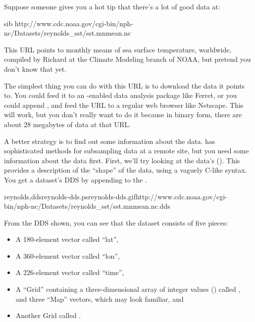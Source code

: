 \documentclass{dods-book}
\begin{document}
Suppose someone gives you a hot tip that there's a lot of good data
at:

\begin{vcode}{sib}
http://www.cdc.noaa.gov/cgi-bin/nph-nc/Datasets/reynolds_sst/sst.mnmean.nc
\end{vcode}

This URL points to monthly means of sea surface temperature,
worldwide, compiled by Richard  at the Climate Modeling branch
of NOAA, but pretend you don't know that yet. 

The simplest thing you can do with this URL is to download the data it
points to.  You could feed it to an \opendap-enabled data analysis package
like Ferret, or you could append , and feed the URL to a
regular web browser like Netscape.  This will work, but you don't
really want to do it because in binary form, there are about 28
megabytes of data at that URL.


A better strategy is to find out some information about the data.
\opendap has sophisticated methods for subsampling data at a remote site,
but you need some information about the data first.  First, we'll try
looking at the data's  ().  This
provides a description of the ``shape'' of the data, using a vaguely
C-like syntax.  You get a dataset's DDS by appending  to the
.

{reynolds,dds}{reynolds-dds.ps}{reynolds-dds.gif}{http://www.cdc.noaa.gov/cgi-bin/nph-nc/Datasets/reynolds_sst/sst.mnmean.nc.dds}

From the DDS shown, you can see that the dataset consists of five
pieces: 

\begin{itemize}
\item A 180-element vector called ``lat'',
\item A 360-element vector called ``lon'',
\item A 226-element vector called ``time'',
\item A ``Grid'' containing a three-dimensional array of integer
  values () called , and three ``Map'' vectors,
  which may look familiar, and
\item Another Grid called .
\end{itemize}
\end{document}

